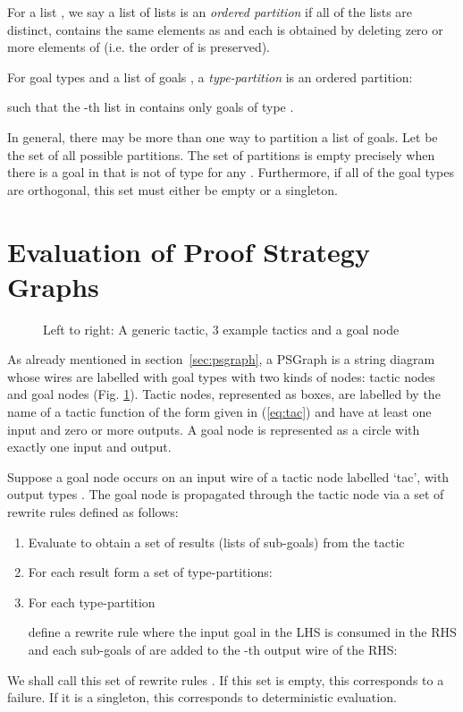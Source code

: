 \documentclass{llncs}
\begin{document}
For a list , we say a list of lists  is an \textit{ordered partition} if all of the lists are distinct,  contains the same elements as  and each  is obtained by deleting zero or more elements of  (i.e. the order of  is preserved).

\begin{definition} \rm
For goal types  and a list of goals , a \textit{type-partition} is an ordered partition:

such that the -th list in  contains only goals of type .
\end{definition}
In general, there may be more than one way to partition a list of goals. Let  be the set of all possible partitions. The set of partitions is empty precisely when there is a goal in  that is not of type  for any . Furthermore, if all of the goal types are orthogonal, this set must either be empty or a singleton.

\beforesection
\section{Evaluation of Proof Strategy Graphs}\label{sec:lang}
\aftersection


\begin{figure}
  \centering
{}
  \caption{Left to right: A generic tactic, 3 example tactics and a goal node}\label{fig:tac-and-goal-nodes}
\end{figure}

\noindent As already mentioned in section~\ref{sec:psgraph}, a PSGraph is a string diagram whose wires are labelled with goal types with two kinds of nodes: tactic nodes and goal nodes (Fig. \ref{fig:tac-and-goal-nodes}). Tactic nodes, represented as boxes, are labelled by the name of a tactic function of the form given in (\ref{eq:tac}) and have at least one input and zero or more outputs. A goal node is represented as a circle with exactly one input and output. 

Suppose a goal node  occurs on an input wire of a tactic node labelled `tac', with output types . The goal node  is propagated through the tactic node via a set of rewrite rules defined as follows:
\begin{enumerate}
  \item Evaluate  to obtain a set of results (lists of sub-goals) from the tactic
  \item For each result  form a set of type-partitions: 
  \item For each type-partition
  
  define a rewrite rule where the input goal in the LHS is consumed in the RHS and each sub-goals of  are added to the -th output wire of the RHS:
  
\end{enumerate}
We shall call this set of rewrite rules . If this set is empty, this corresponds to a failure. If it is a singleton, this corresponds to deterministic evaluation.
\end{document}
